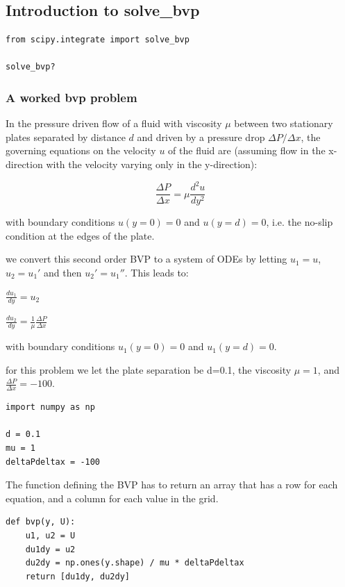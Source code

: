 \documentclass[11pt]{article}
\begin{document}
\subsection{Introduction to solve\_bvp}
\label{sec:orgbbc6ea6}

\begin{verbatim}
from scipy.integrate import solve_bvp

solve_bvp?
\end{verbatim}

\subsubsection{A worked bvp problem}
\label{sec:org63f52bd}

In the pressure driven flow of a fluid with viscosity \(\mu\) between two stationary plates separated by distance \(d\) and driven by a pressure drop \(\Delta P/\Delta x\), the governing equations on the velocity \(u\) of the fluid are (assuming flow in the x-direction with the velocity varying only in the y-direction):

$$\frac{\Delta P}{\Delta x} = \mu \frac{d^2u}{dy^2}$$

with boundary conditions \(u(y=0) = 0\) and \(u(y=d) = 0\), i.e. the no-slip condition at the edges of the plate.

we convert this second order BVP to a system of ODEs by letting \(u_1 = u\), \(u_2 = u_1'\) and then \(u_2' = u_1''\). This leads to:

\(\frac{d u_1}{dy} = u_2\)

\(\frac{d u_2}{dy} = \frac{1}{\mu}\frac{\Delta P}{\Delta x}\)

with boundary conditions \(u_1(y=0) = 0\) and \(u_1(y=d) = 0\).

for this problem we let the plate separation be d=0.1, the viscosity \(\mu = 1\), and \(\frac{\Delta P}{\Delta x} = -100\).


\begin{verbatim}
import numpy as np

d = 0.1
mu = 1
deltaPdeltax = -100
\end{verbatim}

The function defining the BVP has to return an array that has a row for each equation, and a column for each value in the grid.

\begin{verbatim}
def bvp(y, U):
    u1, u2 = U
    du1dy = u2
    du2dy = np.ones(y.shape) / mu * deltaPdeltax
    return [du1dy, du2dy]
\end{verbatim}
\end{document}
